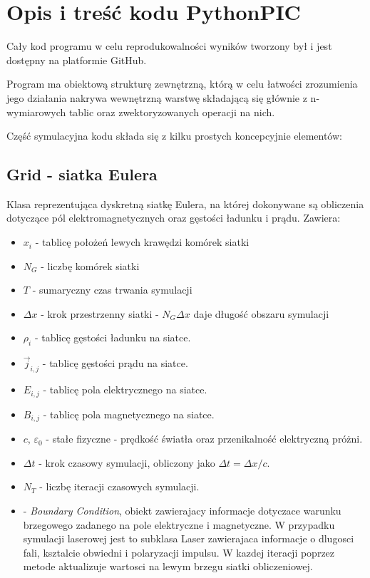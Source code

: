 \section{Opis i treść kodu PythonPIC}
Cały kod programu w celu reprodukowalności wyników tworzony był i jest
dostępny na platformie GitHub\cite{github-repo}.

Program ma obiektową strukturę zewnętrzną, którą w celu łatwości
zrozumienia jego działania nakrywa wewnętrzną warstwę składającą się
głównie z n-wymiarowych tablic  oraz zwektoryzowanych
operacji na nich.

Część symulacyjna kodu składa się z kilku prostych koncepcyjnie elementów:

\subsection{Grid - siatka Eulera}
Klasa reprezentująca dyskretną siatkę Eulera, na której dokonywane są
obliczenia dotyczące pól elektromagnetycznych oraz gęstości ładunku i
prądu.  Zawiera:
\begin{itemize}
    \item $x_i$ - tablicę położeń lewych krawędzi komórek siatki
    \item $N_G$ - liczbę komórek siatki
    \item $T$ - sumaryczny czas trwania symulacji
    \item $\Delta x$ - krok przestrzenny siatki - $N_G \Delta x$ daje
        długość obszaru symulacji
    \item $\rho_i$ - tablicę gęstości ładunku na siatce.
    \item $\vec{j}_{i,j}$ - tablicę gęstości prądu na siatce.
    \item $E_{i,j}$ - tablicę pola elektrycznego na siatce.
    \item $B_{i,j}$ - tablicę pola magnetycznego na siatce.
    \item $c$, $\varepsilon_0$ - stałe fizyczne - prędkość światła oraz
        przenikalność elektryczną próżni.
    \item $\Delta t$ - krok czasowy symulacji, obliczony jako $\Delta t =
        \Delta x / c$.
    \item $N_T$ - liczbę iteracji czasowych symulacji.
    \item {} - \emph{Boundary Condition}, obiekt zawierajacy informacje dotyczace
        warunku brzegowego zadanego na pole elektryczne i magnetyczne. W przypadku symulacji
        laserowej jest to subklasa Laser zawierajaca informacje o dlugosci fali, ksztalcie obwiedni
        i polaryzacji impulsu. W kazdej iteracji  poprzez metode
         aktualizuje wartosci na lewym brzegu siatki obliczeniowej.
\end{itemize}

